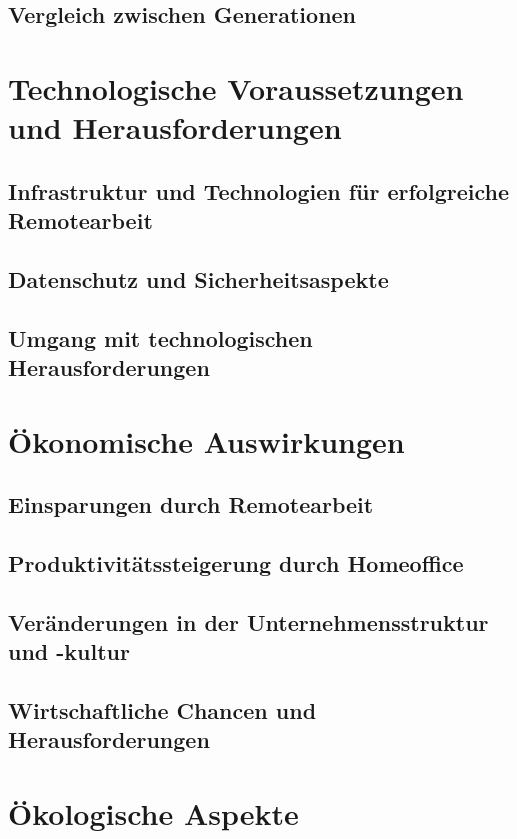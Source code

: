 \documentclass[runningheads]{llncs}
\begin{document}
\subsection{Vergleich zwischen Generationen}


\newpage
\section{Technologische Voraussetzungen und Herausforderungen}

\subsection{Infrastruktur und Technologien für erfolgreiche Remotearbeit}

\subsection{Datenschutz und Sicherheitsaspekte}

\subsection{Umgang mit technologischen Herausforderungen}


\newpage
\section{Ökonomische Auswirkungen}

\subsection{Einsparungen durch Remotearbeit}

\subsection{Produktivitätssteigerung durch Homeoffice}

\subsection{Veränderungen in der Unternehmensstruktur und -kultur}

\subsection{Wirtschaftliche Chancen und Herausforderungen}


\newpage
\section{Ökologische Aspekte}
\end{document}

